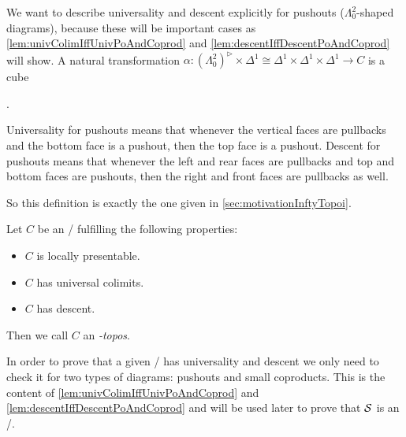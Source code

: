 \begin{remark}
    We want to describe universality and descent explicitly for pushouts ($\Lambda^2_0$-shaped diagrams), because these will be important cases as \cref{lem:univColimIffUnivPoAndCoprod} and \cref{lem:descentIffDescentPoAndCoprod} will show.
    A natural transformation $\alpha\colon\left(\Lambda_0^2\right)^{\rhd}\times\Delta^1\cong\Delta^1\times\Delta^1\times\Delta^1\to C$ is a cube
    \begin{center}
        \;.
    \end{center}
    Universality for pushouts means that whenever the vertical faces are pullbacks and the bottom face is a pushout, then the top face is a pushout.
    Descent for pushouts means that whenever the left and rear faces are pullbacks and top and bottom faces are pushouts, then the right and front faces are pullbacks as well.
    
    So this definition is exactly the one given in \cref{sec:motivationInftyTopoi}.
\end{remark}
\begin{definition}
    Let $C$ be an \inftycat/ fulfilling the following properties:
    \begin{itemize}
        \item $C$ is locally presentable.
        \item $C$ has universal colimits.
        \item $C$ has descent.
    \end{itemize}
    Then we call $C$ an \emph{\infty-topos}.
\end{definition}
In order to prove that a given \inftycat/ has universality and descent we only need to check it for two types of diagrams: pushouts and small coproducts.
This is the content of \cref{lem:univColimIffUnivPoAndCoprod} and \cref{lem:descentIffDescentPoAndCoprod} and will be used later to prove that $\mathcal{S}$ is an \inftytop/.

